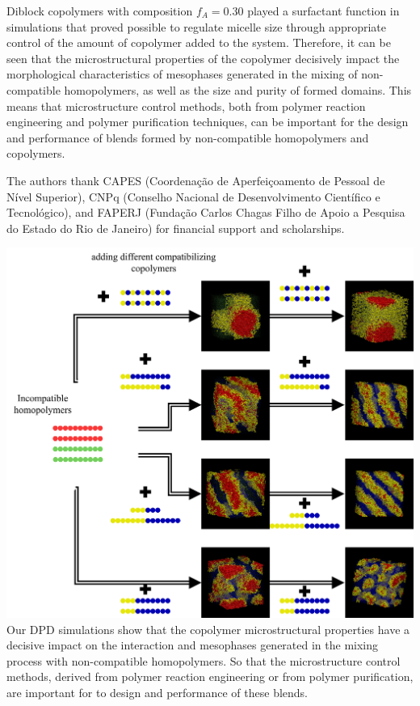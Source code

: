 \documentclass[
journal=mamobx,
manuscript=article,
]{achemso}
\begin{document}
Diblock copolymers with composition $f_A=0.30$ played a surfactant function in simulations that proved possible to regulate micelle size through appropriate control of the amount of copolymer added to the system.
Therefore, it can be seen that the microstructural properties of the copolymer decisively impact the morphological characteristics of mesophases generated in the mixing of non-compatible homopolymers, as well as the size and purity of formed domains.
This means that microstructure control methods, both from polymer reaction engineering and polymer purification techniques, can be important for the design and performance of blends formed by non-compatible homopolymers and copolymers. 

\begin{acknowledgement}

The authors thank CAPES (Coordena\c{c}\~ao de Aperfei\c{c}oamento de Pessoal de N\'ivel Superior), CNPq (Conselho Nacional de Desenvolvimento Cient\'ifico e Tecnol\'ogico), and FAPERJ (Funda\c{c}\~ao Carlos Chagas Filho de Apoio a Pesquisa do Estado do Rio de Janeiro) for financial support and scholarships.

\end{acknowledgement}



\begin{tocentry}
	\includegraphics[width=\linewidth]{ToCfigure}
	Our DPD simulations show that the copolymer microstructural properties have a decisive impact on the interaction and mesophases generated in the mixing process with non-compatible homopolymers.
	So that the microstructure control methods, derived from polymer reaction engineering or from polymer purification, are important for to design and performance of these blends.
\end{tocentry}
\end{document}
